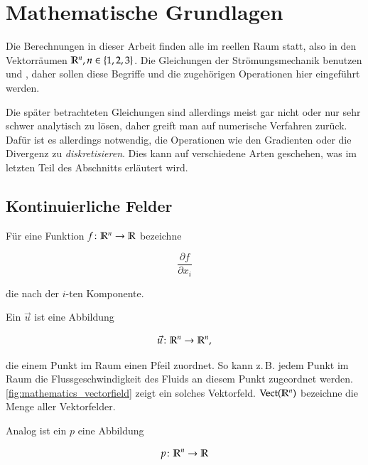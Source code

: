 \section{Mathematische Grundlagen}

Die Berechnungen in dieser Arbeit finden alle im reellen Raum statt, also in den
Vektorräumen $\mathbb{R}^n, n \in \{1,2,3\}$. Die Gleichungen der
Strömungsmechanik benutzen  und
, daher sollen diese Begriffe und die zugehörigen
Operationen hier eingeführt werden.

Die später betrachteten Gleichungen sind allerdings meist gar nicht oder nur sehr
schwer analytisch zu lösen, daher greift man auf numerische Verfahren zurück.
Dafür ist es allerdings notwendig, die Operationen wie den Gradienten oder die
Divergenz zu \emph{diskretisieren}. Dies kann auf verschiedene Arten geschehen,
was im letzten Teil des Abschnitts erläutert wird.

\subsection{Kontinuierliche Felder}

Für eine Funktion $f \colon \mathbb{R}^n \to \mathbb{R}$ bezeichne

\begin{equation}
\frac{\partial f}{\partial x_i}
\end{equation}

die  nach der $i$-ten Komponente.

Ein  $\vec{u}$ ist eine Abbildung

\begin{equation*}
\vec{u} \colon \mathbb{R}^n \to \mathbb{R}^n,
\end{equation*}

die einem Punkt im Raum einen Pfeil zuordnet. So kann z.\,B. jedem Punkt im Raum
die Flussgeschwindigkeit des Fluids an diesem Punkt zugeordnet werden.
\autoref{fig:mathematics_vectorfield} zeigt ein solches Vektorfeld.
$\operatorname*{Vect}(\mathbb{R}^n)$ bezeichne die Menge aller Vektorfelder.

Analog ist ein  $p$ eine Abbildung

\begin{equation*}
p \colon \mathbb{R}^n \to \mathbb{R}
\end{equation*}

